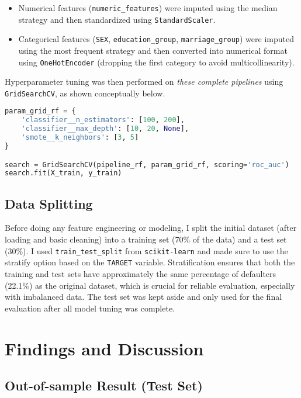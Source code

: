 \documentclass[a4paper,12pt]{article}
\begin{document}
\begin{itemize}
    \item Numerical features (\texttt{numeric\_features}) were imputed using the median strategy and then standardized using \texttt{StandardScaler}.
    \item Categorical features (\texttt{SEX}, \texttt{education\_group}, \texttt{marriage\_group}) were imputed using the most frequent strategy and then converted into numerical format using \texttt{OneHotEncoder} (dropping the first category to avoid multicollinearity).
\end{itemize}

Hyperparameter tuning was then performed on \textit{these complete pipelines} using \texttt{GridSearchCV}, as shown conceptually below.

\begin{lstlisting}[language=Python, caption={GridSearchCV for tuning Random Forest}, label={lst:tune}]
param_grid_rf = {
    'classifier__n_estimators': [100, 200],
    'classifier__max_depth': [10, 20, None],
    'smote__k_neighbors': [3, 5]
}

search = GridSearchCV(pipeline_rf, param_grid_rf, scoring='roc_auc')
search.fit(X_train, y_train)
\end{lstlisting}

\subsection{Data Splitting}

Before doing any feature engineering or modeling, I split the initial dataset (after loading and basic cleaning) into a training set (70\% of the data) and a test set (30\%). I used \texttt{train\_test\_split} from \texttt{scikit-learn} and made sure to use the stratify option based on the \texttt{TARGET} variable. Stratification ensures that both the training and test sets have approximately the same percentage of defaulters (22.1\%) as the original dataset, which is crucial for reliable evaluation, especially with imbalanced data. The test set was kept aside and only used for the final evaluation after all model tuning was complete.

\section{Findings and Discussion}

\subsection{Out-of-sample Result (Test Set)}
\end{document}
